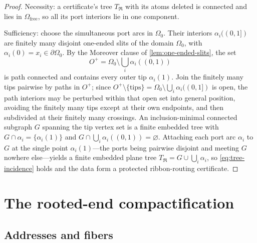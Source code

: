 \documentclass[11pt,reqno]{amsart}
\numberwithin{equation}{section}
\theoremstyle{plain}
\theoremstyle{definition}
\theoremstyle{remark}
\begin{document}
\begin{proof}
Necessity: a certificate's tree $T_{\mathfrak R}$ with its atoms
deleted is connected and lies in $\Omega_{\mathrm{free}}$, so all its
port interiors lie in one component.

Sufficiency: choose the simultaneous port arcs in $\Omega_0$.  Their
interiors $\alpha_i((0,1])$ are finitely many disjoint one-ended slits
of the domain $\Omega_0$, with $\alpha_i(0)=x_i\in\partial\Omega_0$.
By the Moreover clause of \cref{lem:one-ended-slits}, the set
\[
 O^+
 =
 \Omega_0\setminus\bigcup_i\alpha_i((0,1))
\]
is path connected and contains every outer tip $\alpha_i(1)$.  Join the
finitely many tips pairwise by paths in $O^+$; since
$O^+\setminus\{\text{tips}\}=\Omega_0\setminus\bigcup_i\alpha_i((0,1])$
is open, the path interiors may be perturbed within that open set into
general position, avoiding the finitely many tips except at their own
endpoints, and then subdivided at their finitely many crossings.  An
inclusion-minimal connected subgraph $G$ spanning the tip vertex set is
a finite embedded tree with
$G\cap\alpha_i=\{\alpha_i(1)\}$ and
$G\cap\bigcup_i\alpha_i((0,1))=\varnothing$.  Attaching each port arc
$\alpha_i$ to $G$ at the single point $\alpha_i(1)$---the ports being
pairwise disjoint and meeting $G$ nowhere else---yields a finite
embedded plane tree $T_{\mathfrak R}=G\cup\bigcup_i\alpha_i$, so
\eqref{eq:tree-incidence} holds and the data form a protected
ribbon-routing certificate.
\end{proof}

\section{The rooted-end compactification}
\label{sec:compactification}

\subsection{Addresses and fibers}
\end{document}
